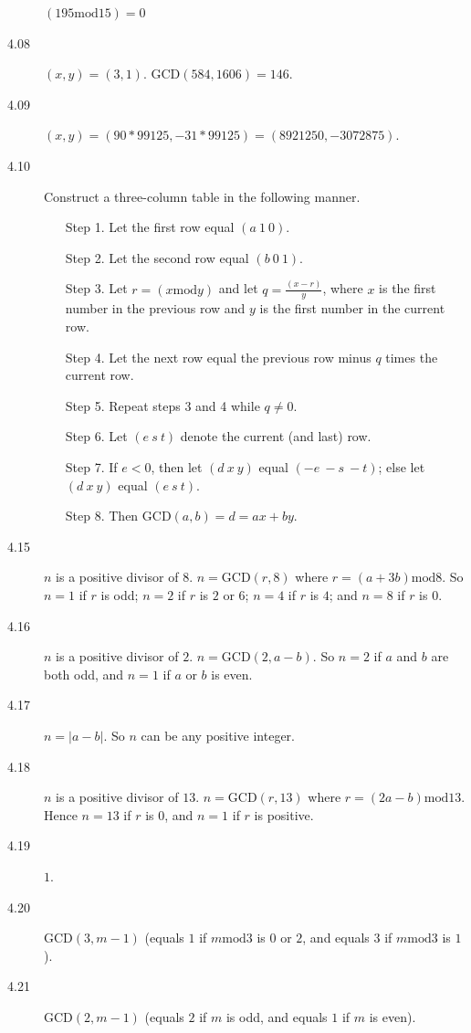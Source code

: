 \documentclass{article}
\begin{document}
\begin{description}
    \begin{center}$(195 \text{mod} 15) = 0$\end{center}
  \item[4.08] $(x,y) = (3,1)$. $\text{GCD}(584, 1606) = 146$.
  \item[4.09] $(x,y)=(90*99125, -31*99125)=(8921250, -3072875)$.
  \item[4.10] Construct a three-column table in the following manner.
    \begin{itemize}
      \item[Step 1.] Let the first row equal $(a \ 1 \ 0)$.
      \item[Step 2.] Let the second row equal $(b \ 0 \ 1)$.
      \item[Step 3.] Let $r=(x \text{mod} y)$ and let $q = \frac{(x- r)}{y}$, where $x$ is the first number in the previous row and $y$ is the first number in the current row.
      \item[Step 4.] Let the next row equal the previous row minus $q$ times the current row.
      \item[Step 5.] Repeat steps 3 and 4 while $q \neq 0$.
      \item[Step 6.] Let $(e \ s \ t)$ denote the current (and last) row.
      \item[Step 7.] If $e<0$, then let $(d \ x \ y)$ equal $(-e \ -s \ -t)$; else let $(d \ x \ y)$ equal $(e \ s \ t)$.
      \item[Step 8.] Then $\text{GCD}(a,b)=d=ax+by$.
    \end{itemize}
  \item[4.15] $n$ is a positive divisor of $8$. $n = \text{GCD}(r,8)$ where $r = (a+3b) \text{mod} 8$. So $n=1$ if $r$ is odd; $n=2$ if $r$ is $2$ or $6$; $n=4$ if $r$ is $4$; and $n=8$ if $r$ is $0$.
  \item[4.16] $n$ is a positive divisor of $2$. $n = \text{GCD}(2,a-b)$. So $n=2$ if $a$ and $b$ are both odd, and $n=1$ if $a$ or $b$ is even.
  \item[4.17] $n = \vert a-b \vert$. So $n$ can be any positive integer.
  \item[4.18] $n$ is a positive divisor of $13$. $n = \text{GCD}(r,13)$ where $r = (2a-b) \text{mod} 13$. Hence $n=13$ if $r$ is $0$, and $n=1$ if $r$ is positive.
  \item[4.19] $1$.
  \item[4.20] $\text{GCD}(3,m-1)$ (equals $1$ if $m \text{mod} 3$ is $0$ or $2$, and equals $3$ if $m \text{mod} 3$ is $1$).
  \item[4.21] $\text{GCD}(2,m-1)$ (equals $2$ if $m$ is odd, and equals $1$ if $m$ is even).
\end{description}
\vspace{0.3cm}
\end{document}
